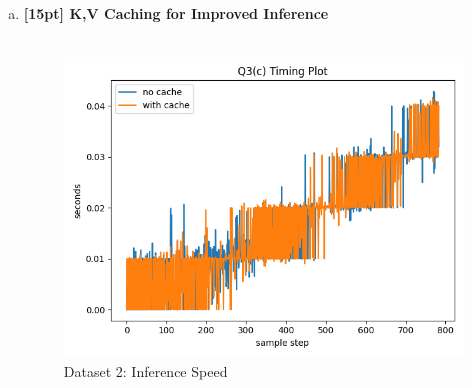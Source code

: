 \documentclass{article}
\begin{document}
\begin{enumerate}[(a)]
\newpage

\item {\bf [15pt] K,V Caching for Improved Inference} \\\\
\begin{figure}[H]
    \centering
    \includegraphics[width=\textwidth]{figures/q3_c_dset2_timing_plot.png}
    \caption{Dataset 2: Inference Speed}
\end{figure}


\end{enumerate}
\end{document}

